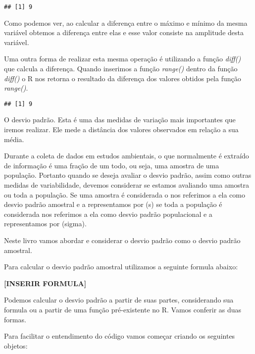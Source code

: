 \documentclass[]{book}
\newenvironment{Shaded}{\begin{snugshade}}{\end{snugshade}}
\newcommand{\KeywordTok}[1]{\textcolor[rgb]{0.13,0.29,0.53}{\textbf{#1}}}
\newcommand{\NormalTok}[1]{#1}
\newcommand{\OperatorTok}[1]{\textcolor[rgb]{0.81,0.36,0.00}{\textbf{#1}}}
\begin{document}
\begin{verbatim}
## [1] 9
\end{verbatim}

Como podemos ver, ao calcular a diferença entre o máximo e mínimo da mesma variável obtemos a diferença entre elas e esse valor consiste na amplitude desta variável.

Uma outra forma de realizar esta mesma operação é utilizando a função \emph{diff()} que calcula a diferença. Quando inserimos a função \emph{range()} dentro da função \emph{diff()} o R nos retorna o resultado da diferença dos valores obtidos pela função \emph{range()}.

\begin{Shaded}
\end{Shaded}

\begin{verbatim}
## [1] 9
\end{verbatim}

O desvio padrão. Esta é uma das medidas de variação mais importantes que iremos realizar. Ele mede a distância dos valores observados em relação a sua média.

Durante a coleta de dados em estudos ambientais, o que normalmente é extraído de informação é uma fração de um todo, ou seja, uma amostra de uma população. Portanto quando se deseja avaliar o desvio padrão, assim como outras medidas de variabilidade, devemos considerar se estamos avaliando uma amostra ou toda a população. Se uma amostra é considerada o nos referimos a ela como desvio padrão amostral e a representamos por (s) se toda a população é considerada nos referimos a ela como desvio padrão populacional e a representamos por (sigma).

Neste livro vamos abordar e considerar o desvio padrão como o desvio padrão amostral.

Para calcular o desvio padrão amostral utilizamos a seguinte formula abaixo:

\textbf{{[}INSERIR FORMULA{]}}

Podemos calcular o desvio padrão a partir de suas partes, considerando sua formula ou a partir de uma função pré-existente no R. Vamos conferir as duas formas.

Para facilitar o entendimento do código vamos começar criando os seguintes objetos:
\end{document}
